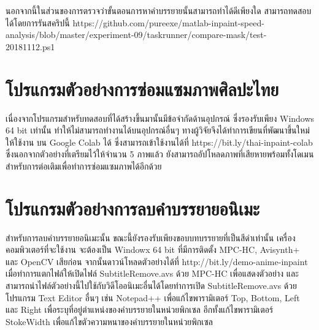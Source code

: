 \hspace{1cm} นอกจากนี้ในส่วนของการตรวจว่าขั้นตอนการหาคำบรรยายนั้นสามารถทำได้ดีเพียงใด สามารถทดสอบได้โดยการรันสคริปนี้ https://github.com/pureexe/matlab-inpaint-speed-analysis/blob/master/experiment-09/taskrunner/compare-mask/test-20181112.ps1




\section{โปรแกรมตัวอย่างการซ่อมแซมภาพศิลปะไทย}
\hspace{1cm} เนื่องจากโปรแกรมสำหรับทดสอบที่ได้สร้างขึ้นมานั้นมีข้อจำกัดด้านอุปกรณ์ ซึ่งรองรับเพียง Windows 64 bit เท่านั้น ทำให้ไม่สามารถทำงานได้บนอุปกรณ์อื่นๆ ทางผู้วิจัยจึงได้ทำการเขียนที่พัฒนาขึ้นใหม่ให้ใช้งาน บน Google Colab ได้ ซึ่งสามารถเข้าใช้งานได้ที่ https://bit.ly/thai-inpaint-colab ซึ่งนอกจากตัวอย่างที่เตรียมไว้ให้จำนวน 5 ภาพแล้ว ยังสามารถอัปโหลดภาพที่เสียหายพร้อมทั้งโดเมนสำหรับการต่อเติมเพื่อทำการซ่อมแซมภาพได้อีกด้วย





\section{โปรแกรมตัวอย่างการลบคำบรรยายอนิเมะ}
\hspace{1cm} สำหรับการลบคำบรรยายอนิเมะนั้น ขณะนี้ยังรองรับเพียงขอบบทบรรยายที่เป็นสีดำเท่านั้น เครื่องคอมพิวเตอร์ที่จะใช้งาน จะต้องเป็น Windowx 64 bit ที่มีการติดตั้ง MPC-HC, Avisynth+ และ OpenCV เสียก่อน จากนั้นดาวน์โหลดตัวอย่างได้ที่ http://bit.ly/demo-anime-inpaint เมื่อทำการแตกไฟล์ให้เปิดไฟล์ SubtitleRemove.avs ด้วย MPC-HC เพื่อแสดงตัวอย่าง และสามารถนำไฟล์ตัวอย่างนี้ไปใช้กับวิดีโออนิเมะอื่นได้โดยทำการเปิด SubtitleRemove.avs ด้วยโปรแกรม Text Editor อื่นๆ เช่น Notepad++ เพื่อแก้ไขพารามิเตอร์ Top, Bottom, Left และ Right เพื่อระบุที่อยู่ตำแหน่งของคำบรรยายในหน่วยพิกเซล อีกทั้งแก้ไขพารามิเตอร์ StokeWidth เพื่อแก้ไขตัวความหนาของคำบรรยายในหน่วยพิกเซล



